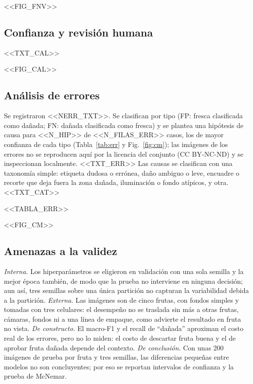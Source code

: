 \documentclass[10pt,twocolumn,letterpaper]{article}
\begin{document}
<<FIG_FNV>>

\subsection{Confianza y revisión humana}
<<TXT_CAL>>

<<FIG_CAL>>

\subsection{Análisis de errores}
Se registraron <<NERR_TXT>>. Se clasifican por tipo (FP: fresca clasificada como dañada; FN: dañada clasificada como fresca) y se plantea una hipótesis de causa para <<N_HIP>> de <<N_FILAS_ERR>> casos, los de mayor confianza de cada tipo (Tabla~\ref{tab:err} y Fig.~\ref{fig:cm}); las imágenes de los errores no se reproducen aquí por la licencia del conjunto (CC BY-NC-ND) y se inspeccionan localmente. <<TXT_ERR>> Las causas se clasifican con una taxonomía simple: etiqueta dudosa o errónea, daño ambiguo o leve, encuadre o recorte que deja fuera la zona dañada, iluminación o fondo atípicos, y otra. <<TXT_CAT>>

\begin{table}[t]\centering\footnotesize{}\caption{Errores seleccionados del mejor modelo en prueba.}\label{tab:err}
\setlength{\tabcolsep}{3pt}<<TABLA_ERR>>\end{table}

<<FIG_CM>>

\subsection{Amenazas a la validez}
\textit{Interna.} Los hiperparámetros se eligieron en validación con una sola semilla y la mejor época también, de modo que la prueba no interviene en ninguna decisión; aun así, tres semillas sobre una única partición no capturan la variabilidad debida a la partición. \textit{Externa.} Las imágenes son de cinco frutas, con fondos simples y tomadas con tres celulares: el desempeño no se traslada sin más a otras frutas, cámaras, fondos ni a una línea de empaque, como advierte el resultado en fruta no vista. \textit{De constructo.} El macro-F1 y el recall de ``dañada'' aproximan el costo real de los errores, pero no lo miden: el costo de descartar fruta buena y el de aprobar fruta dañada depende del contexto. \textit{De conclusión.} Con unas 200 imágenes de prueba por fruta y tres semillas, las diferencias pequeñas entre modelos no son concluyentes; por eso se reportan intervalos de confianza y la prueba de McNemar.
\end{document}
